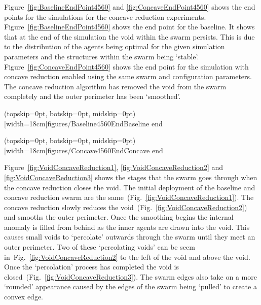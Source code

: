 \documentclass{ieeeaccess}
\begin{document}
Figure~\ref{fig:BaselineEndPoint4560} and \ref{fig:ConcaveEndPoint4560} shows the end points for the simulations for the concave reduction experiments. Figure~\ref{fig:BaselineEndPoint4560} shows the end point for the baseline. It shows that at the end of the simulation the void within the swarm persists. This is due to the distribution of the agents being optimal for the given simulation parameters and the structures within the swarm being `stable'. Figure~\ref{fig:ConcaveEndPoint4560} shows the end point for the simulation with concave reduction enabled using the same swarm and configuration parameters. The concave reduction algorithm has removed the void from the swarm completely and the outer perimeter has been `smoothed'. 

\Figure[t!](topskip=0pt, botskip=0pt, midskip=0pt)[width=18cm]{figures/Baseline4560End}{Baseline end\label{fig:BaselineEndPoint4560}}

\Figure[t!](topskip=0pt, botskip=0pt, midskip=0pt)[width=18cm]{figures/Concave4560End}{Concave end\label{fig:ConcaveEndPoint4560}}

Figure~\ref{fig:VoidConcaveReduction1}, \ref{fig:VoidConcaveReduction2} and \ref{fig:VoidConcaveReduction3} shows the stages that the swarm goes through when the concave reduction closes the void. The initial deployment of the baseline and concave reduction swarm are the same~(Fig.~\ref{fig:VoidConcaveReduction1}). The concave reduction slowly reduces the void~(Fig.~\ref{fig:VoidConcaveReduction2}) and smooths the outer perimeter. Once the smoothing begins the internal anomaly is filled from behind as the inner agents are drawn into the void. This causes small voids to `percolate' outwards through the swarm until they meet an outer perimeter. Two of these `percolating voids' can be seem in~Fig.~\ref{fig:VoidConcaveReduction2} to the left of the void and above the void. Once the `percolation' process has completed the void is closed~(Fig.~\ref{fig:VoidConcaveReduction3}). The swarm edges also take on a more `rounded' appearance caused by the edges of the swarm being `pulled' to create a convex edge.
\end{document}
